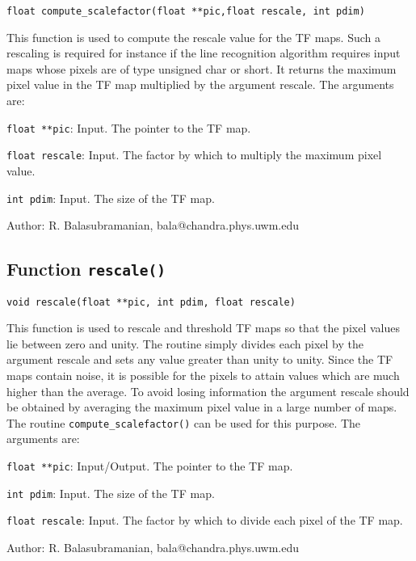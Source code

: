 {\tt float compute\_scalefactor(float **pic,float rescale, int pdim)}

This function is used to compute the rescale value for the TF
maps. Such a rescaling is required for instance if the line
recognition algorithm requires input maps whose pixels are of type
unsigned char or short. It returns the maximum pixel value in the TF map multiplied by
the argument rescale. The arguments are:

\begin{description}
\item {\tt float **pic}: Input. The pointer to the TF map.
\item {\tt float rescale}: Input. The factor by which to multiply
the maximum pixel value.
\item {\tt int pdim}: Input. The size of the TF map. 
\end{description}

\noindent Author: R. Balasubramanian, bala@chandra.phys.uwm.edu

\newpage

\subsection{Function {\tt rescale()}}

{\tt void rescale(float **pic, int pdim, float rescale)}

This function is used to rescale and threshold TF maps so that the
pixel values lie between  zero and unity. The routine simply divides
each pixel by the argument rescale and sets any value greater than
unity to unity. Since the TF maps contain noise, it is possible for
the pixels to attain values which are much higher than the average.
To avoid losing information the argument rescale should  be obtained by
averaging the maximum pixel value in a large number of maps.
The routine {\tt compute\_scalefactor()} can be used for this purpose.
The arguments are:
\begin{description}
\item {\tt float **pic}: Input/Output. The pointer to the TF map.
\item {\tt int pdim}: Input. The size of the TF map. 
\item {\tt float rescale}: Input. The factor by which to divide
each pixel of the TF map.
\end{description}

\noindent Author: R. Balasubramanian, bala@chandra.phys.uwm.edu

